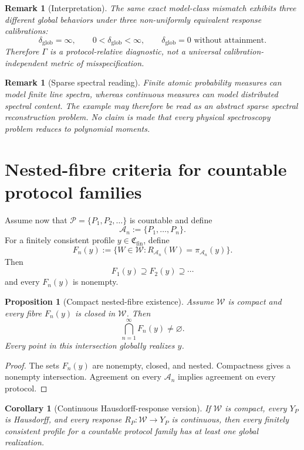 \documentclass[11pt]{article}
\newtheorem{proposition}[definition]{Proposition}
\newtheorem{corollary}[definition]{Corollary}
\newtheorem{remark}[definition]{Remark}
\newcommand{\W}{\mathcal W}
\newcommand{\Pcal}{\mathcal P}
\newcommand{\Acal}{\mathcal A}
\newcommand{\Cfin}{\mathfrak C_{\mathrm{fin}}}
\begin{document}
\begin{remark}[Interpretation]
The same exact model-class mismatch exhibits three different global behaviors
under three non-uniformly equivalent response calibrations:
\[
\delta_{\mathrm{glob}}=\infty,
\qquad
0<\delta_{\mathrm{glob}}<\infty,
\qquad
\delta_{\mathrm{glob}}=0\text{ without attainment}.
\]
Therefore $\Gamma$ is a protocol-relative diagnostic, not a universal
calibration-independent metric of misspecification.
\end{remark}

\begin{remark}[Sparse spectral reading]
Finite atomic probability measures can model finite line spectra, whereas
continuous measures can model distributed spectral content. The example may
therefore be read as an abstract sparse spectral reconstruction problem. No
claim is made that every physical spectroscopy problem reduces to polynomial
moments.
\end{remark}

\section{Nested-fibre criteria for countable protocol families}

Assume now that $\Pcal=\{P_1,P_2,\ldots\}$ is countable and define
\[
\Acal_n:=\{P_1,\ldots,P_n\}.
\]
For a finitely consistent profile $y\in\Cfin$, define
\[
F_n(y)
:=
\{W\in\W:R_{\Acal_n}(W)=\pi_{\Acal_n}(y)\}.
\]
Then
\[
F_1(y)\supseteq F_2(y)\supseteq\cdots
\]
and every $F_n(y)$ is nonempty.

\begin{proposition}[Compact nested-fibre existence]
Assume $\W$ is compact and every fibre $F_n(y)$ is closed in $\W$. Then
\[
\bigcap_{n=1}^{\infty}F_n(y)\neq\varnothing.
\]
Every point in this intersection globally realizes $y$.
\end{proposition}

\begin{proof}
The sets $F_n(y)$ are nonempty, closed, and nested. Compactness gives a
nonempty intersection. Agreement on every $\Acal_n$ implies agreement on every
protocol.
\end{proof}

\begin{corollary}[Continuous Hausdorff-response version]
If $\W$ is compact, every $Y_P$ is Hausdorff, and every response
$R_P:\W\to Y_P$ is continuous, then every finitely consistent profile for a
countable protocol family has at least one global realization.
\end{corollary}
\end{document}
